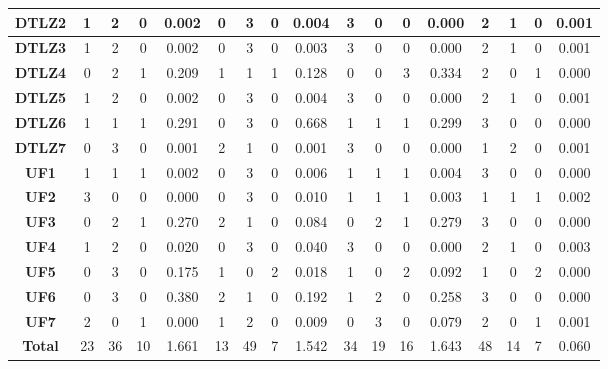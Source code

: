 \begin{table*}[t]
\begin{tabular}{c c|c|c|c|c|c|c|c|c|c|c|c|c|c|c|c}
\multicolumn{1}{c|}{\textbf{DTLZ2}} & 1 & 2 & 0 & 0.002 & 0 & 3 & 0 & 0.004 & 3 & 0 & 0 & 0.000 & 2 & 1 & 0 & 0.001 \\ \hline
\multicolumn{1}{c|}{\textbf{DTLZ3}} & 1 & 2 & 0 & 0.002 & 0 & 3 & 0 & 0.003 & 3 & 0 & 0 & 0.000 & 2 & 1 & 0 & 0.001 \\ \hline
\multicolumn{1}{c|}{\textbf{DTLZ4}} & 0 & 2 & 1 & 0.209 & 1 & 1 & 1 & 0.128 & 0 & 0 & 3 & 0.334 & 2 & 0 & 1 & 0.000 \\ \hline
\multicolumn{1}{c|}{\textbf{DTLZ5}} & 1 & 2 & 0 & 0.002 & 0 & 3 & 0 & 0.004 & 3 & 0 & 0 & 0.000 & 2 & 1 & 0 & 0.001 \\ \hline
\multicolumn{1}{c|}{\textbf{DTLZ6}} & 1 & 1 & 1 & 0.291 & 0 & 3 & 0 & 0.668 & 1 & 1 & 1 & 0.299 & 3 & 0 & 0 & 0.000 \\ \hline
\multicolumn{1}{c|}{\textbf{DTLZ7}} & 0 & 3 & 0 & 0.001 & 2 & 1 & 0 & 0.001 & 3 & 0 & 0 & 0.000 & 1 & 2 & 0 & 0.001 \\ \hline
\multicolumn{1}{c|}{\textbf{UF1}} & 1 & 1 & 1 & 0.002 & 0 & 3 & 0 & 0.006 & 1 & 1 & 1 & 0.004 & 3 & 0 & 0 & 0.000 \\ \hline
\multicolumn{1}{c|}{\textbf{UF2}} & 3 & 0 & 0 & 0.000 & 0 & 3 & 0 & 0.010 & 1 & 1 & 1 & 0.003 & 1 & 1 & 1 & 0.002 \\ \hline
\multicolumn{1}{c|}{\textbf{UF3}} & 0 & 2 & 1 & 0.270 & 2 & 1 & 0 & 0.084 & 0 & 2 & 1 & 0.279 & 3 & 0 & 0 & 0.000 \\ \hline
\multicolumn{1}{c|}{\textbf{UF4}} & 1 & 2 & 0 & 0.020 & 0 & 3 & 0 & 0.040 & 3 & 0 & 0 & 0.000 & 2 & 1 & 0 & 0.003 \\ \hline
\multicolumn{1}{c|}{\textbf{UF5}} & 0 & 3 & 0 & 0.175 & 1 & 0 & 2 & 0.018 & 1 & 0 & 2 & 0.092 & 1 & 0 & 2 & 0.000 \\ \hline
\multicolumn{1}{c|}{\textbf{UF6}} & 0 & 3 & 0 & 0.380 & 2 & 1 & 0 & 0.192 & 1 & 2 & 0 & 0.258 & 3 & 0 & 0 & 0.000 \\ \hline
\multicolumn{1}{c|}{\textbf{UF7}} & 2 & 0 & 1 & 0.000 & 1 & 2 & 0 & 0.009 & 0 & 3 & 0 & 0.079 & 2 & 0 & 1 & 0.001 \\ \hline
\multicolumn{1}{c|}{\textbf{Total}} & 23 & 36 & 10 & 1.661 & 13 & 49 & 7 & 1.542 & 34 & 19 & 16 & 1.643 & 48 & 14 & 7 & 0.060 \\ \hline
\end{tabular}%
\end{table*}



